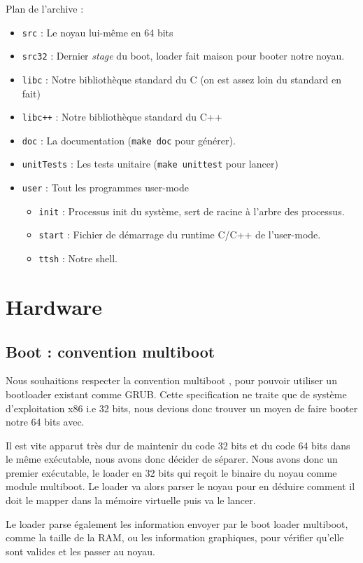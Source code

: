 \documentclass[12pt]{report}
\begin{document}
Plan de l'archive :
\begin{itemize}
\item \verb$src$ : Le noyau lui-même en 64 bits
\item \verb$src32$ : Dernier \textit{stage} du boot, loader fait maison pour
  booter notre noyau.
\item \verb$libc$ : Notre bibliothèque \og standard \fg{} du C (on est assez
  loin du standard en fait)
\item \verb$libc++$ : Notre bibliothèque \og standard \fg{} du C++
\item \verb$doc$ : La documentation (\verb$make doc$ pour générer).
\item \verb$unitTests$ : Les tests unitaire (\verb$make unittest$ pour lancer)
\item \verb$user$ : Tout les programmes user-mode
  \begin{itemize}
  \item \verb$init$ : Processus init du système, sert de racine à l'arbre des
    processus.
  \item \verb$start$ : Fichier de démarrage du runtime C/C++ de l'user-mode.
  \item \verb$ttsh$ : Notre shell.
  \end{itemize}
\end{itemize}


\chapter{Hardware}

\section{Boot : convention multiboot}

Nous souhaitions respecter la convention multiboot \cite{multiboot}, pour
pouvoir utiliser un bootloader existant comme GRUB. Cette specification ne
traite que de système d'exploitation x86 i.e 32 bits, nous devions donc trouver
un moyen de faire booter notre 64 bits avec.

Il est vite apparut très dur de maintenir du code 32 bits et du code 64 bits
dans le même exécutable, nous avons donc décider de séparer. Nous avons donc un
premier exécutable, le loader en 32 bits qui reçoit le binaire du noyau comme
module multiboot. Le loader va alors parser le noyau pour en déduire comment il
doit le mapper dans la mémoire virtuelle puis va le lancer.

Le loader parse également les information envoyer par le boot loader multiboot,
comme la taille de la RAM, ou les information graphiques, pour vérifier qu'elle
sont valides et les passer au noyau.
\end{document}
